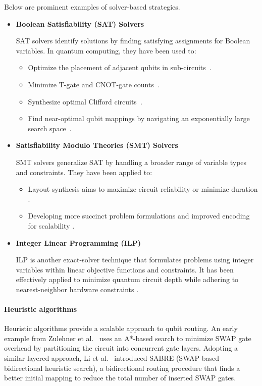 \documentclass[a4paper,onecolumn,11pt,unpublished]{quantumarticle}
\begin{document}
Below are prominent examples of solver-based strategies.
\begin{itemize}
  \item \textbf{Boolean Satisfiability (SAT) Solvers}

    SAT solvers identify solutions by finding satisfying assignments for Boolean variables. In quantum computing, they have been used to:
    \begin{itemize}
      \item Optimize the placement of adjacent qubits in sub-circuits~\cite{Hattori2018GateOrder2DNN}.
      \item Minimize T-gate and CNOT-gate counts~\cite{Meuli2018SATCNOT}.
      \item Synthesize optimal Clifford circuits~\cite{Schneider2023SATClifford}.
      \item Find near-optimal qubit mappings by navigating an exponentially large search space~\cite{willeMappingQuantumCircuits2019}.
    \end{itemize}
  \item \textbf{Satisfiability Modulo Theories (SMT) Solvers}

    SMT solvers generalize SAT by handling a broader range of variable types and constraints. They have been applied to:
    \begin{itemize}
      \item Layout synthesis aims to maximize circuit reliability or minimize duration \cite{Tan2020Optimal,Murali2019NoiseAdaptive}.
      \item Developing more succinct problem formulations and improved encoding for scalability \cite{Lin2022ScalableOptimalLayout}.
    \end{itemize}
  \item \textbf{Integer Linear Programming (ILP)}

    ILP is another exact-solver technique that formulates problems using integer variables within linear objective functions and constraints. It has been effectively applied to minimize quantum circuit depth while adhering to nearest-neighbor hardware constraints \cite{Bhattacharjee2019MUQUT,Bhattacharjee2017DepthOptimalPlacement}.
\end{itemize}

\paragraph{Heuristic algorithms}
Heuristic algorithms provide a scalable approach to qubit routing. An early example from Zulehner et al.~\cite{Zulehner2018Efficient} uses an A*-based search to minimize SWAP gate overhead by partitioning the circuit into concurrent gate layers. Adopting a similar layered approach, Li et al.~\cite{Li2019Tackling} introduced SABRE (SWAP-based bidirectional heuristic search), a bidirectional routing procedure that finds a better initial mapping to reduce the total number of inserted SWAP gates.
\end{document}
